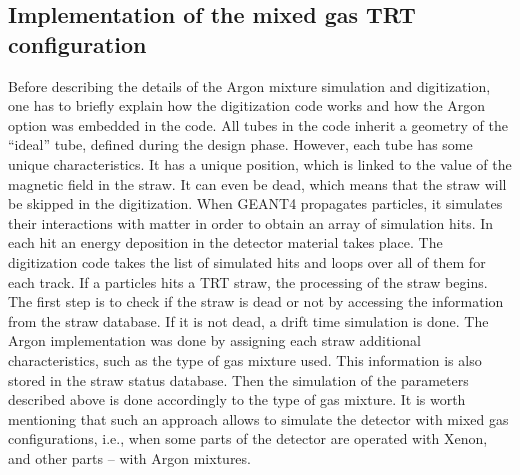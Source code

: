 \subsection{Implementation of the mixed gas TRT configuration}
Before describing the details of the Argon mixture simulation and digitization, one has to briefly explain how the digitization code works and how the Argon option was embedded in the code.
All tubes in the code inherit a geometry of the ``ideal'' tube, defined during the design phase. However, each tube has some unique characteristics. It has a unique position, 
which is linked to the value of the magnetic field in the straw. 
It can even be dead, which means that the straw will be skipped in the digitization.
When GEANT4 propagates particles, it simulates their interactions with matter in order to obtain an array of simulation hits. In each hit an energy deposition in the 
detector material takes place. The digitization code takes the list of simulated hits and loops over all of them for each track. If a particles hits a TRT straw, the processing of the straw begins.
The first step is to check if the straw is dead or not by accessing the information from the straw database.
If it is not dead, a drift time simulation is done.
The Argon implementation was done by assigning each straw additional characteristics, such as the type of gas mixture used. This information is also stored in the straw status database.
Then the simulation of the parameters described above is done accordingly to the type of gas mixture.
It is worth mentioning that such an approach allows to simulate the detector with mixed gas configurations, i.e., when some parts of the detector are operated with Xenon, and other parts -- with Argon mixtures.

